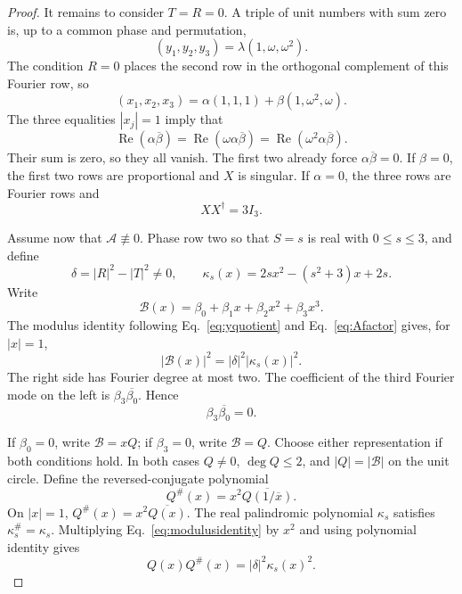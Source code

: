 \documentclass[aps,prx,reprint,nofootinbib,twoside,superscriptaddress,longbibliography,floatfix]{revtex4-2}
\theoremstyle{definition}
\newcommand{\RePart}{\operatorname{Re}}
\begin{document}
\begin{proof}
It remains to consider $T=R=0$.  A triple of unit numbers with sum zero is, up to a common phase and permutation,
\begin{equation}
(y_1,y_2,y_3)=\lambda(1,\omega,\omega^2).
\label{eq:unitzerosum}
\end{equation}
The condition $R=0$ places the second row in the orthogonal complement of this Fourier row, so
\begin{equation}
(x_1,x_2,x_3)
=\alpha(1,1,1)+\beta(1,\omega^2,\omega).
\label{eq:xFourierdecomp}
\end{equation}
The three equalities $|x_j|=1$ imply that
\begin{equation}
\RePart(\alpha\overline\beta)
=\RePart(\omega\alpha\overline\beta)
=\RePart(\omega^2\alpha\overline\beta).
\label{eq:threeRe}
\end{equation}
Their sum is zero, so they all vanish.  The first two already force $\alpha\overline\beta=0$.  If $\beta=0$, the first two rows are proportional and $X$ is singular.  If $\alpha=0$, the three rows are Fourier rows and
\begin{equation}
XX^{\dagger}=3I_3.
\label{eq:dependentFourier}
\end{equation}

Assume now that $\mathcal A\not\equiv0$. Phase row two so that $S=s$ is real with $0\leq s\leq3$, and define
\begin{equation}
\delta=|R|^2-|T|^2\neq0,
\qquad
\kappa_s(x)=2sx^2-(s^2+3)x+2s.
\label{eq:deltakappas}
\end{equation}
Write
\begin{equation}
\mathcal B(x)=\beta_0+\beta_1x+\beta_2x^2+\beta_3x^3.
\label{eq:Bbeta}
\end{equation}
The modulus identity following Eq.~\eqref{eq:yquotient} and Eq.~\eqref{eq:Afactor} gives, for $|x|=1$,
\begin{equation}
|\mathcal B(x)|^2=|\delta|^2|\kappa_s(x)|^2.
\label{eq:modulusidentity}
\end{equation}
The right side has Fourier degree at most two.  The coefficient of the third Fourier mode on the left is $\beta_3\overline{\beta_0}$.  Hence
\begin{equation}
\beta_3\overline{\beta_0}=0.
\label{eq:endcoefficient}
\end{equation}

If $\beta_0=0$, write $\mathcal B=xQ$; if $\beta_3=0$, write $\mathcal B=Q$.  Choose either representation if both conditions hold.  In both cases $Q\neq0$, $\deg Q\leq2$, and $|Q|=|\mathcal B|$ on the unit circle.  Define the reversed-conjugate polynomial
\begin{equation}
Q^{\#}(x)=x^2\overline{Q(1/\overline x)}.
\label{eq:Qsharp}
\end{equation}
On $|x|=1$, $Q^{\#}(x)=x^2\overline{Q(x)}$.  The real palindromic polynomial $\kappa_s$ satisfies $\kappa_s^{\#}=\kappa_s$. Multiplying Eq.~\eqref{eq:modulusidentity} by $x^2$ and using polynomial identity gives
\begin{equation}
Q(x)Q^{\#}(x)=|\delta|^2\kappa_s(x)^2.
\label{eq:QQsharp}
\end{equation}


\end{proof}
\end{document}

